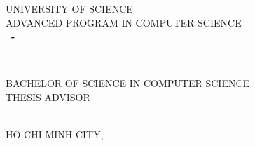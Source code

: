 \begin{titlepage}

\begin{center}
UNIVERSITY OF SCIENCE\\
ADVANCED PROGRAM IN COMPUTER SCIENCE\\[2cm]

{ \Large \bfseries \MakeUppercase{\tenSV ~-~ \mssv} \\[2cm] } %

{ \LARGE \bfseries \MakeUppercase{\tenKL} \\[2cm] } %

\Large BACHELOR OF SCIENCE IN COMPUTER SCIENCE\\[2cm]

\Large THESIS ADVISOR\\
\MakeUppercase{\tenGVHD} \\[2cm]


\vfill
HO CHI MINH CITY, \the\year

\end{center}

\end{titlepage}